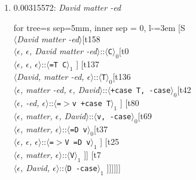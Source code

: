 \documentclass[11pt]{article}
\begin{document}
\begin{enumerate}
	\item  0.00315572: \textit{David matter -ed} \\[0.5em]
	\begin{forest}
	for tree={s sep=5mm, inner sep = 0, l-=3em}
	[S\\$\langle$\textit{David matter -ed}$\rangle$[t158\\$\langle$\textit{$\epsilon${,} $\epsilon${,} David matter -ed}$\rangle$::$\langle$\texttt{C}$\rangle_0$[t0\\$\langle$\textit{$\epsilon${,} $\epsilon${,} $\epsilon$}$\rangle$::$\langle$\texttt{{=}T C}$\rangle_1$ ] [t137\\$\langle$\textit{David{,} matter -ed{,} $\epsilon$}$\rangle$::$\langle$\texttt{T}$\rangle_0$[t136\\$\langle$\textit{$\epsilon${,} matter -ed{,} $\epsilon${,} David}$\rangle$::$\langle$\texttt{+case T{,} -case}$\rangle_0$[t42\\$\langle$\textit{$\epsilon${,} -ed{,} $\epsilon$}$\rangle$::$\langle$\texttt{{=}$>$v +case T}$\rangle_1$ ] [t80\\$\langle$\textit{$\epsilon${,} matter{,} $\epsilon${,} David}$\rangle$::$\langle$\texttt{v{,} -case}$\rangle_0$[t69\\$\langle$\textit{$\epsilon${,} matter{,} $\epsilon$}$\rangle$::$\langle$\texttt{{=}D v}$\rangle_0$[t37\\$\langle$\textit{$\epsilon${,} $\epsilon${,} $\epsilon$}$\rangle$::$\langle$\texttt{{=}$>$V {=}D v}$\rangle_1$ ] [t25\\$\langle$\textit{$\epsilon${,} matter{,} $\epsilon$}$\rangle$::$\langle$\texttt{V}$\rangle_1$ ]] [t7\\$\langle$\textit{$\epsilon${,} David{,} $\epsilon$}$\rangle$::$\langle$\texttt{D -case}$\rangle_1$ ]]]]]]
	\end{forest}
	\newpage


\end{enumerate}
\end{document}
